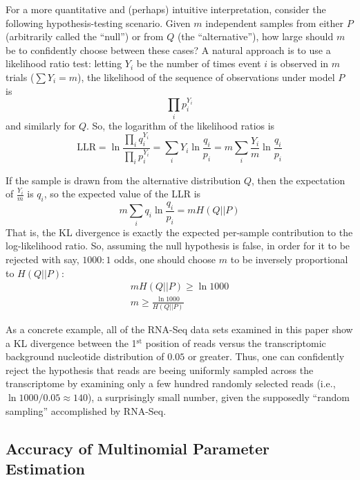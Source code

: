 \documentclass[letterpaper]{article}
\begin{document}
For a more quantitative and (perhaps) intuitive interpretation, consider the
following hypothesis-testing scenario. Given $m$ independent samples from either
$P$ (arbitrarily called the ``null'') or from $Q$ (the ``alternative''), how
large should $m$ be to confidently choose between these cases? A natural
approach is to use a likelihood ratio test: letting $Y_i$ be the number of times
event $i$ is observed in $m$ trials ($\sum Y_i = m$), the likelihood of the
sequence of observations under model $P$ is $$\prod_{i} p_{i}^{Y_{i}}$$
and similarly for $Q$. So, the logarithm of the likelihood ratios is
$$
\text{LLR} =
\ln \frac{\prod_{i} q_{i} ^ {Y_{i}}}{\prod_{i} p_{i} ^ {Y_{i}}}
= \sum_{i} Y_{i} \ln \frac{q_{i}}{p_{i}}
= m \sum_{i} \frac{Y_{i}}{m} \ln \frac{q_{i}}{p_{i}} $$

If the sample is drawn from the alternative distribution $Q$, then the
expectation of $\frac{Y_{i}}{m}$ is $q_i$, so the expected value of the LLR is
$$ m \sum_{i} q_{i} \ln \frac{q_{i}}{p_{i}} = m H(Q || P) $$
That is, the KL divergence is exactly the expected per-sample contribution to
the log-likelihood ratio.
So, assuming the null hypothesis is false, in order for it to be rejected with
say, $1000:1$ odds, one should choose $m$ to be inversely proportional to $H(Q ||
P)$:
\begin{align*}
m H(Q||P) \ge \ln 1000 \\
m \ge \frac{\ln 1000}{H(Q || P)}
\end{align*}

As a concrete example, all of the RNA-Seq data sets examined in this paper show
a KL divergence between the 1$^{\text{st}}$ position of reads versus the
transcriptomic background nucleotide distribution of $0.05$ or greater. Thus,
one can confidently reject the hypothesis that reads are beeing uniformly
sampled across the transcriptome by examining only a few hundred randomly
selected reads (i.e., $\ln 1000 / 0.05 \approx 140$), a surprisingly small
number, given the supposedly ``random sampling'' accomplished by RNA-Seq.


\subsection{Accuracy of Multinomial Parameter Estimation}
\end{document}
